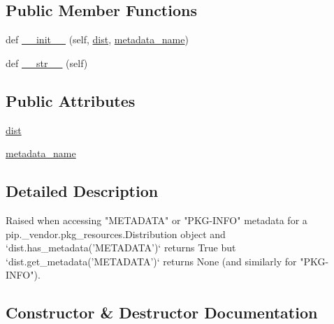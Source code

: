 \subsection*{Public Member Functions}
\begin{DoxyCompactItemize}
\item 
def \hyperlink{classpip_1_1__internal_1_1exceptions_1_1NoneMetadataError_a936f3398057dc75442151c8c14e37079}{\+\_\+\+\_\+init\+\_\+\+\_\+} (self, \hyperlink{classpip_1_1__internal_1_1exceptions_1_1NoneMetadataError_abb15dea81454b2d82a0bd4460aeb47f5}{dist}, \hyperlink{classpip_1_1__internal_1_1exceptions_1_1NoneMetadataError_a481999145818b3f67f84c05fde8ab1eb}{metadata\+\_\+name})
\item 
def \hyperlink{classpip_1_1__internal_1_1exceptions_1_1NoneMetadataError_a3cb49ed76fcd4d5150eb431788cc9e4d}{\+\_\+\+\_\+str\+\_\+\+\_\+} (self)
\end{DoxyCompactItemize}
\subsection*{Public Attributes}
\begin{DoxyCompactItemize}
\item 
\hyperlink{classpip_1_1__internal_1_1exceptions_1_1NoneMetadataError_abb15dea81454b2d82a0bd4460aeb47f5}{dist}
\item 
\hyperlink{classpip_1_1__internal_1_1exceptions_1_1NoneMetadataError_a481999145818b3f67f84c05fde8ab1eb}{metadata\+\_\+name}
\end{DoxyCompactItemize}


\subsection{Detailed Description}
\begin{DoxyVerb}Raised when accessing "METADATA" or "PKG-INFO" metadata for a
pip._vendor.pkg_resources.Distribution object and
`dist.has_metadata('METADATA')` returns True but
`dist.get_metadata('METADATA')` returns None (and similarly for
"PKG-INFO").
\end{DoxyVerb}
 

\subsection{Constructor \& Destructor Documentation}
\mbox{\label{classpip_1_1__internal_1_1exceptions_1_1NoneMetadataError_a936f3398057dc75442151c8c14e37079}} 
